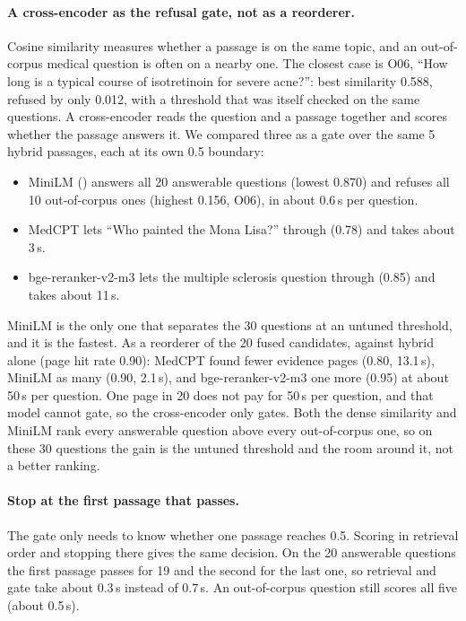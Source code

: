 \paragraph{A cross-encoder as the refusal gate, not as a reorderer.}
Cosine similarity measures whether a passage is on the same topic, and an out-of-corpus medical
question is often on a nearby one. The closest case is O06, ``How long is a typical course of
isotretinoin for severe acne?'': best similarity 0.588, refused by only 0.012, with a threshold that
was itself checked on the same questions. A cross-encoder reads the question and a passage together
and scores whether the passage answers it. We compared three as a gate over the same 5 hybrid
passages, each at its own 0.5 boundary:
\begin{itemize}[leftmargin=1.5em]
  \item MiniLM () answers all 20 answerable questions (lowest 0.870) and
        refuses all 10 out-of-corpus ones (highest 0.156, O06), in about 0.6\,s per question.
  \item MedCPT lets ``Who painted the Mona Lisa?'' through (0.78) and takes about 3\,s.
  \item bge-reranker-v2-m3 lets the multiple sclerosis question through (0.85) and takes about 11\,s.
\end{itemize}
MiniLM is the only one that separates the 30 questions at an untuned threshold, and it is the
fastest. As a reorderer of the 20 fused candidates, against hybrid alone (page hit rate 0.90):
MedCPT found fewer evidence pages (0.80, 13.1\,s), MiniLM as many (0.90, 2.1\,s), and
bge-reranker-v2-m3 one more (0.95) at about 50\,s per question. One page in 20 does not pay for 50\,s
per question, and that model cannot gate, so the cross-encoder only gates. Both the dense similarity
and MiniLM rank every answerable question above every out-of-corpus one, so on these 30 questions
the gain is the untuned threshold and the room around it, not a better ranking.

\paragraph{Stop at the first passage that passes.}
The gate only needs to know whether one passage reaches 0.5. Scoring in retrieval order and
stopping there gives the same decision. On the 20 answerable questions the first passage passes for
19 and the second for the last one, so retrieval and gate take about 0.3\,s instead of 0.7\,s. An
out-of-corpus question still scores all five (about 0.5\,s).

